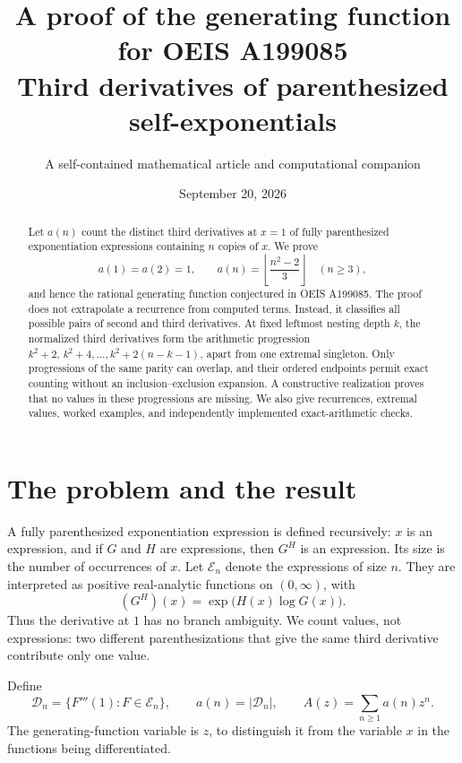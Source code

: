 \documentclass[11pt,letterpaper]{article}
\title{\color{Ink}\LARGE\bfseries A proof of the generating function\\[0.2em]
for OEIS A199085\\[0.55em]
\large\normalfont Third derivatives of parenthesized self-exponentials}
\author{A self-contained mathematical article and computational companion}
\date{September 20, 2026}
\numberwithin{equation}{section}
\theoremstyle{definition}
\theoremstyle{remark}
\newcommand{\E}{\mathcal E}
\newcommand{\Dset}{\mathcal D}
\newcommand{\GF}{A(z)}
\begin{document}
\maketitle
\begin{abstract}
Let $a(n)$ count the distinct third derivatives at $x=1$ of fully
parenthesized exponentiation expressions containing $n$ copies of $x$.
We prove
\[
 a(1)=a(2)=1,\qquad
 a(n)=\left\lfloor\frac{n^2-2}{3}\right\rfloor\quad(n\ge3),
\]
and hence the rational generating function conjectured in OEIS A199085.
The proof does not extrapolate a recurrence from computed terms.
Instead, it classifies all possible pairs of second and third derivatives.
At fixed leftmost nesting depth $k$, the normalized third derivatives
form the arithmetic progression
$k^2+2,\,k^2+4,\ldots,k^2+2(n-k-1)$, apart from one extremal singleton.
Only progressions of the same parity can overlap, and their ordered
endpoints permit exact counting without an inclusion--exclusion
expansion. A constructive realization proves that no values in these
progressions are missing. We also give recurrences, extremal values,
worked examples, and independently implemented exact-arithmetic checks.
\end{abstract}

\begingroup
\small
\setlength{\parskip}{0pt}
\setcounter{tocdepth}{1}
\makeatletter
\renewcommand{\l@section}{\@dottedtocline{1}{0em}{2.4em}}
\makeatother
\tableofcontents
\endgroup
\clearpage

\section{The problem and the result}
\label{sec:intro}
A fully parenthesized exponentiation expression is defined recursively:
$x$ is an expression, and if $G$ and $H$ are expressions, then $G^H$
is an expression. Its size is the number of occurrences of $x$.
Let $\E_n$ denote the expressions of size $n$. They are interpreted as
positive real-analytic functions on $(0,\infty)$, with
\[
 (G^H)(x)=\exp\bigl(H(x)\log G(x)\bigr).
\]
Thus the derivative at $1$ has no branch ambiguity. We count values,
not expressions: two different parenthesizations that give the same
third derivative contribute only one value.

Define
\begin{equation}\label{eq:defa}
 \Dset_n=\{F'''(1):F\in\E_n\},\qquad a(n)=|\Dset_n|,
 \qquad \GF=\sum_{n\ge1}a(n)z^n.
\end{equation}
The generating-function variable is $z$, to distinguish it from the
variable $x$ in the functions being differentiated.
\end{document}
